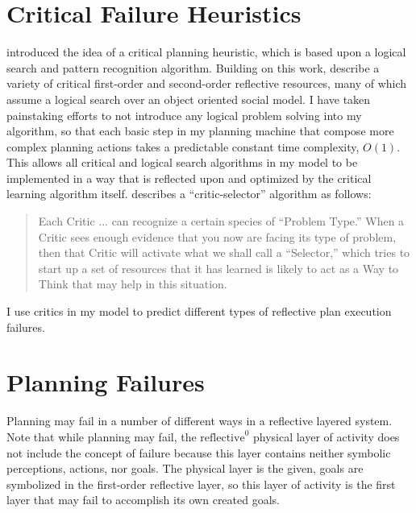 \section{Critical Failure Heuristics}

\cite{sussman:1973} introduced the idea of a critical planning
heuristic, which is based upon a logical search and pattern
recognition algorithm.  Building on this work, \cite{singh:2003,
  singh:2005a} describe a variety of critical first-order and
second-order reflective resources, many of which assume a logical
search over an object oriented social model.  I have taken painstaking
efforts to not introduce any logical problem solving into my
algorithm, so that each basic step in my planning machine that compose
more complex planning actions takes a predictable constant time
complexity, $O(1)$.  This allows all critical and logical search
algorithms in my model to be implemented in a way that is reflected
upon and optimized by the critical learning algorithm itself.
\cite{minsky:2006} describes a ``critic-selector'' algorithm as
follows:
\begin{quote}
Each Critic ... can recognize a certain species of ``Problem Type.''
When a Critic sees enough evidence that you now are facing its type of
problem, then that Critic will activate what we shall call a
``Selector,'' which tries to start up a set of resources that it has
learned is likely to act as a Way to Think that may help in this
situation.
\end{quote}
I use critics in my model to predict different types of reflective
plan execution failures.

\section{Planning Failures}

Planning may fail in a number of different ways in a reflective
layered system.  Note that while planning may fail, the
$\text{reflective}^0$ physical layer of activity does not include the
concept of failure because this layer contains neither symbolic
perceptions, actions, nor goals.  The physical layer is the given,
goals are symbolized in the first-order reflective layer, so this
layer of activity is the first layer that may fail to accomplish its
own created goals.

